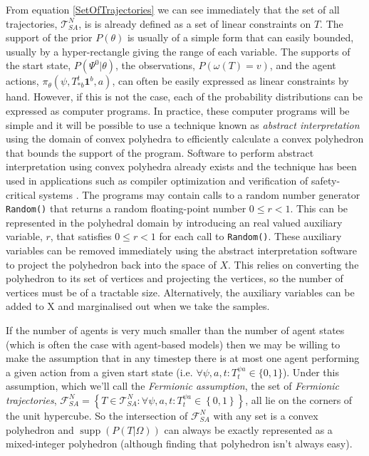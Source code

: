 \documentclass{article}
\DeclareMathOperator\supp{supp}
\begin{document}
From equation \ref{SetOfTrajectories} we can see immediately that the set of all trajectories, $\mathcal{T}^N_{SA}$, is is already defined as a set of linear constraints on $T$. The support of the prior $P(\theta)$ is usually of a simple form that can easily bounded, usually by a hyper-rectangle giving the range of each variable. The supports of the start state, $P(\Psi^0|\theta)$, the observations, $P(\omega(T)=v)$, and the agent actions, $\pi_\theta(\psi,T^t_{*b}\mathbf{1}^b,a)$, can often be easily expressed as linear constraints by hand. However, if this is not the case, each of the probability distributions can be expressed as computer programs. In practice, these computer programs will be simple and it will be possible to use a technique known as \textit{abstract interpretation} \citep{cousot1977abstract} using the domain of convex polyhedra \citep*{cousot1978automatic, becchi2018efficient, fukuda2020polyhedral} to efficiently calculate a convex polyhedron that bounds the support of the program. Software to perform abstract interpretation using convex polyhedra already exists \citep*{henry2012pagai, GN2021, jeannet2009apron, bagnara2008parma} and the technique has been used in applications such as compiler optimization \citep{nsjodin2009design} and verification of safety-critical systems \citep{halbwachs1997verification}. The programs may contain calls to a random number generator \texttt{Random()} that returns a random floating-point number $0 \le r < 1$. This can be represented in the polyhedral domain by introducing an real valued auxiliary variable, $r$, that satisfies $0 \le r < 1$ for each call to \texttt{Random()}. These auxiliary variables can be removed immediately using the abstract interpretation software to project the polyhedron back into the space of $X$. This relies on converting the polyhedron to its set of vertices \citep{motzkin1953double} and projecting the vertices, so the number of vertices must be of a tractable size. Alternatively, the auxiliary variables can be added to X and marginalised out when we take the samples.

If the number of agents is very much smaller than the number of agent states (which is often the case with agent-based models) then we may be willing to make the assumption that in any timestep there is at most one agent performing a given action from a given start state (i.e. $\forall \psi, a, t: T^{\psi a}_t \in \{0,1\}$). Under this assumption, which we'll call the \textit{Fermionic assumption}, the set of \textit{Fermionic trajectories}, $\mathcal{F}^N_{SA} = \left\{T\in\mathcal{T}^N_{SA}: \forall \psi, a, t: T^{\psi a}_t \in \left\{0,1\right\}\right\}$, all lie on the corners of the unit hypercube. So the intersection of $\mathcal{F}^N_{SA}$ with any set is a convex polyhedron and $\supp(P(T|\Omega))$ can always be exactly represented as a mixed-integer polyhedron (although finding that polyhedron isn't always easy).
\end{document}
